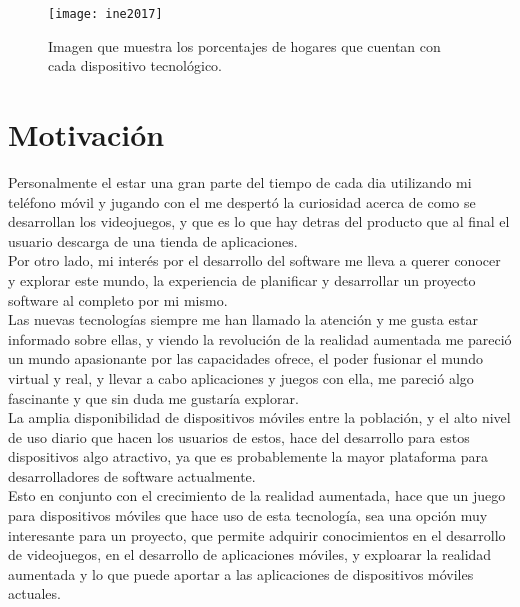 \begin{figure}[h]
  \centering
  \texttt{[image: ine2017]}
  \caption{Imagen que muestra los porcentajes de hogares que cuentan con cada dispositivo tecnológico.\protect\footnotemark}
  \label{figura-ine}
\end{figure}


\newpage

\section{Motivación}
Personalmente el estar una gran parte del tiempo de cada dia utilizando mi teléfono móvil y jugando con el me despertó la curiosidad acerca de como se desarrollan los videojuegos, y que es lo que hay detras del producto que al final el usuario descarga de una tienda de aplicaciones.\\

Por otro lado, mi interés por el desarrollo del software me lleva a querer conocer y explorar este mundo, la experiencia de planificar y desarrollar un proyecto software al completo por mi mismo.\\

Las nuevas tecnologías siempre me han llamado la atención y me gusta estar informado sobre ellas, y viendo la revolución de la realidad aumentada me pareció un mundo apasionante por las capacidades ofrece, el poder fusionar el mundo virtual y real, y llevar a cabo aplicaciones y juegos con ella, me pareció algo fascinante y que sin duda me gustaría explorar.\\

La amplia disponibilidad de dispositivos móviles entre la población, y el alto nivel de uso diario que hacen los usuarios de estos, hace del desarrollo para estos dispositivos algo atractivo, ya que es probablemente la mayor plataforma para desarrolladores de software actualmente.\\

Esto en conjunto con el crecimiento de la realidad aumentada, hace que un juego para dispositivos móviles que hace uso de esta tecnología, sea una opción muy interesante para un proyecto, que permite adquirir conocimientos en el desarrollo de videojuegos, en el desarrollo de aplicaciones móviles, y exploarar la realidad aumentada y lo que puede aportar a las aplicaciones de dispositivos móviles actuales.

